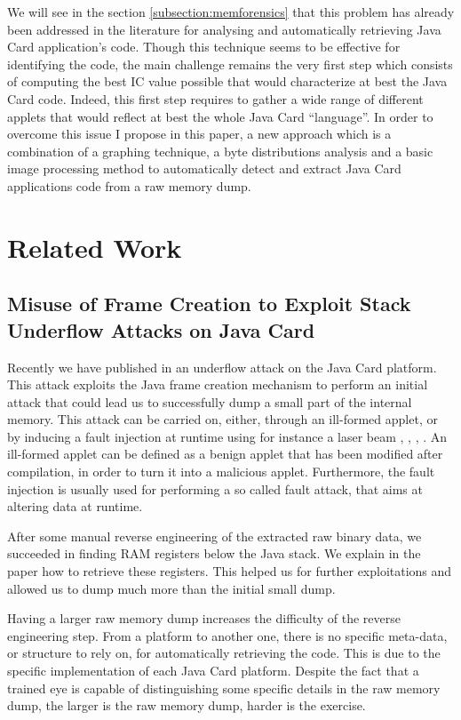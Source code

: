We will see in the section \ref{subsection:memforensics} that this problem has already been
addressed in the literature for  analysing and automatically retrieving Java Card application's code.
Though this technique seems to be effective for identifying the code, the main challenge remains the very
first step which consists of computing the best IC value possible that would characterize at best
the Java Card code. Indeed, this first step requires to gather a wide range of different applets
that would reflect at best the whole Java Card ``language''. In order to overcome this issue
I propose in this paper, a new approach which is a combination of a graphing technique, a byte
distributions analysis and a basic image processing method to automatically detect and extract Java
Card applications code from a raw memory dump.


\section{Related Work}
\label{section:relatedwork}

\subsection{Misuse of Frame Creation to Exploit Stack Underflow Attacks on Java Card} Recently we
have published in \cite{cardis15} an underflow attack on the Java Card platform. This attack
exploits the Java frame creation mechanism to perform an initial attack that could lead us to
successfully dump a small part of the internal memory. This attack can be carried on, either, through
an ill-formed applet, or by inducing a fault injection at runtime using for instance a laser beam \cite{Barbu:2011:JCO:2188509.2188535}, \cite{lancia1}, \cite{conf/cardis/BarbuTG10}, \cite{jic1}.
An ill-formed applet can be defined as a benign applet that has been modified after compilation, in
order to turn it into a malicious applet. Furthermore, the fault injection is usually used for 
performing a so called fault attack, that aims at altering data at runtime.

After some manual reverse engineering of the extracted raw binary data, we succeeded in finding RAM
registers below the Java stack. We explain in the paper how to retrieve these registers. This helped us
for further exploitations and allowed us to dump much more than the initial small dump. 

Having a larger raw memory dump increases the difficulty of the reverse engineering step. From a platform to another one, there is no specific meta-data, or structure to rely on, for automatically retrieving the code. This is due to the specific implementation of each Java Card platform. Despite the fact that a trained eye is capable of distinguishing some specific details in the raw memory dump, the larger is the raw memory dump, harder is the exercise. 

